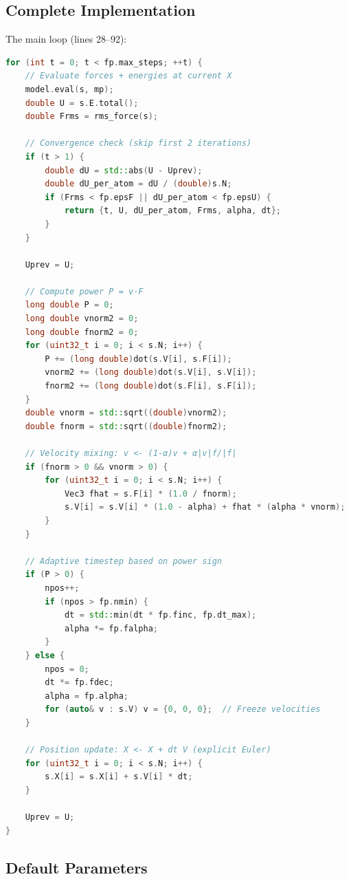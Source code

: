 \documentclass[11pt]{article}
\begin{document}
\subsection{Complete Implementation}

The main loop (lines 28--92):

\begin{lstlisting}[language=C++]
for (int t = 0; t < fp.max_steps; ++t) {
    // Evaluate forces + energies at current X
    model.eval(s, mp);
    double U = s.E.total();
    double Frms = rms_force(s);
    
    // Convergence check (skip first 2 iterations)
    if (t > 1) {
        double dU = std::abs(U - Uprev);
        double dU_per_atom = dU / (double)s.N;
        if (Frms < fp.epsF || dU_per_atom < fp.epsU) {
            return {t, U, dU_per_atom, Frms, alpha, dt};
        }
    }
    
    Uprev = U;
    
    // Compute power P = v·F
    long double P = 0;
    long double vnorm2 = 0;
    long double fnorm2 = 0;
    for (uint32_t i = 0; i < s.N; i++) {
        P += (long double)dot(s.V[i], s.F[i]);
        vnorm2 += (long double)dot(s.V[i], s.V[i]);
        fnorm2 += (long double)dot(s.F[i], s.F[i]);
    }
    double vnorm = std::sqrt((double)vnorm2);
    double fnorm = std::sqrt((double)fnorm2);
    
    // Velocity mixing: v <- (1-α)v + α|v|f/|f|
    if (fnorm > 0 && vnorm > 0) {
        for (uint32_t i = 0; i < s.N; i++) {
            Vec3 fhat = s.F[i] * (1.0 / fnorm);
            s.V[i] = s.V[i] * (1.0 - alpha) + fhat * (alpha * vnorm);
        }
    }
    
    // Adaptive timestep based on power sign
    if (P > 0) {
        npos++;
        if (npos > fp.nmin) {
            dt = std::min(dt * fp.finc, fp.dt_max);
            alpha *= fp.falpha;
        }
    } else {
        npos = 0;
        dt *= fp.fdec;
        alpha = fp.alpha;
        for (auto& v : s.V) v = {0, 0, 0};  // Freeze velocities
    }
    
    // Position update: X <- X + dt V (explicit Euler)
    for (uint32_t i = 0; i < s.N; i++) {
        s.X[i] = s.X[i] + s.V[i] * dt;
    }
    
    Uprev = U;
}
\end{lstlisting}

\subsection{Default Parameters}
\end{document}
